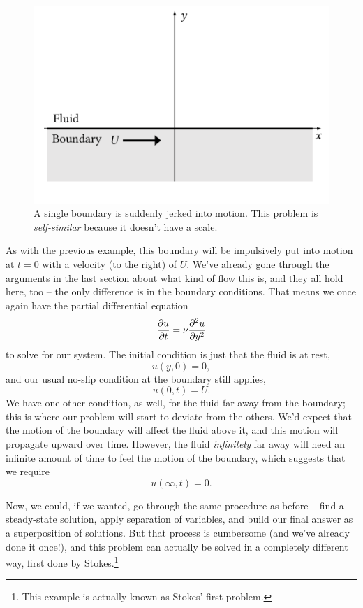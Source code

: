 \begin{figure}
\centering
\includegraphics[width=0.7\linewidth]{Figures/Chapter2/fig_self_sim_setup}
\caption{A single boundary is suddenly jerked into motion.  This problem is \emph{self-similar} because it doesn't have a scale.}
\label{fig_self_sim_setup}
\end{figure}

As with the previous example, this boundary will be impulsively put into motion at $t=0$ with a velocity (to the right) of $U$.  We've already gone through the arguments in the last section about what kind of flow this is, and they all hold here, too -- the only difference is in the boundary conditions.  That means we once again have the partial differential equation
\begin{equation}
\label{eq_ss_diffeq}
\frac{\partial {u}}{\partial {t}} = \nu \frac{\partial^2 {u}}{\partial {y}^2}
\end{equation}
to solve for our system.  The initial condition is just that the fluid is at rest, 
\begin{equation}
u(y, 0) = 0,
\end{equation}
and our usual no-slip condition at the boundary still applies,
\begin{equation}
u(0, t) = U.
\end{equation}
We have one other condition, as well, for the fluid far away from the boundary; this is where our problem will start to deviate from the others.  We'd expect that the motion of the boundary will affect the fluid above it, and this motion will propagate upward over time.  However, the fluid \emph{infinitely} far away will need an infinite amount of time to feel the motion of the boundary, which suggests that we require
\begin{equation}
\label{eq_ss_bc2}
u(\infty, t) = 0.
\end{equation}

Now, we could, if we wanted, go through the same procedure as before -- find a steady-state solution, apply separation of variables, and build our final answer as a superposition of solutions.  But that process is cumbersome (and we've already done it once!), and this problem can actually be solved in a completely different way, first done by Stokes.\footnote{This example is actually known as Stokes' first problem.}

